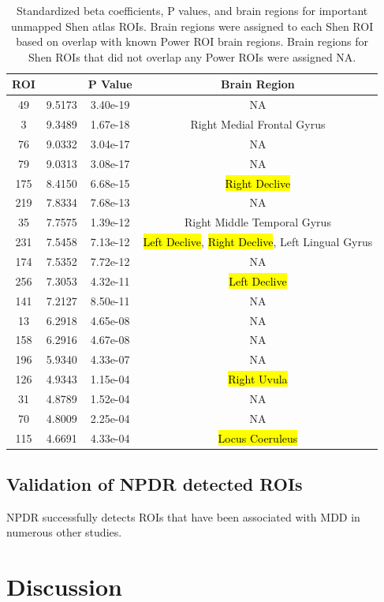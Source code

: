 \documentclass[10pt,letterpaper]{article}\usepackage[]{graphicx}\usepackage[]{color}
\begin{document}
\begin{table}[h!]
	\centering
	\caption{Standardized beta coefficients, P values, and brain regions for important unmapped Shen atlas ROIs. Brain regions were assigned to each Shen ROI based on overlap with known Power ROI brain regions. Brain regions for Shen ROIs that did not overlap any Power ROIs were assigned NA.}\label{tab:unmapped-shen-tab}
\begin{tabular}[h!]{cccc}\toprule
	\textbf{ROI} & \bm{$\beta_a$} & \textbf{P Value} & \textbf{Brain Region} \\ \midrule
	49 & 9.5173 & 3.40e-19 & NA \\
	3 & 9.3489 & 1.67e-18 & Right Medial Frontal Gyrus \\
	76 & 9.0332 & 3.04e-17 & NA \\
	79 & 9.0313 & 3.08e-17 & NA \\
	175 & 8.4150 & 6.68e-15 & \hl{Right Declive} \\
	219 & 7.8334 & 7.68e-13 & NA\\
	35 & 7.7575 & 1.39e-12 & Right Middle Temporal Gyrus\\
	231 & 7.5458 & 7.13e-12 & \hl{Left Declive}, \hl{Right Declive}, Left Lingual Gyrus\\
	174 & 7.5352 & 7.72e-12 & NA \\
	256 & 7.3053 & 4.32e-11 & \hl{Left Declive} \\
	141 & 7.2127 & 8.50e-11 & NA \\
	13 & 6.2918 & 4.65e-08 & NA \\
	158 & 6.2916 & 4.67e-08 & NA \\
	196 & 5.9340 & 4.33e-07 & NA \\
	126 & 4.9343 & 1.15e-04 & \hl{Right Uvula} \\
	31 & 4.8789 & 1.52e-04 & NA \\
	70 & 4.8009 & 2.25e-04 & NA \\
	115 & 4.6691 & 4.33e-04 & \hl{Locus Coeruleus} \\ \bottomrule
\end{tabular}
\end{table}

\subsection{Validation of NPDR detected ROIs}

NPDR successfully detects ROIs that have been associated with MDD in numerous other studies. 

\section{Discussion}


\end{document}
